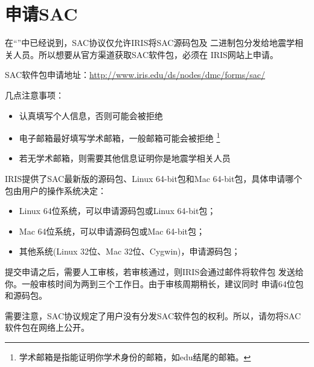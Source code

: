 \section{申请SAC}
在``''中已经说到，SAC协议仅允许IRIS将SAC源码包及
二进制包分发给地震学相关人员。所以想要从官方渠道获取SAC软件包，必须在
IRIS网站上申请。

SAC软件包申请地址：\url{http://www.iris.edu/ds/nodes/dmc/forms/sac/}

几点注意事项：
\begin{itemize}
\item 认真填写个人信息，否则可能会被拒绝
\item 电子邮箱最好填写学术邮箱，一般邮箱可能会被拒绝
    \footnote{学术邮箱是指能证明你学术身份的邮箱，如edu结尾的邮箱。}
\item 若无学术邮箱，则需要其他信息证明你是地震学相关人员
\end{itemize}

IRIS提供了SAC最新版的源码包、Linux 64-bit包和Mac 64-bit包，具体申请哪个
包由用户的操作系统决定：
\begin{itemize}
\item Linux 64位系统，可以申请源码包或Linux 64-bit包；
\item Mac 64位系统，可以申请源码包或Mac 64-bit包；
\item 其他系统(Linux 32位、Mac 32位、Cygwin)，申请源码包；
\end{itemize}

提交申请之后，需要人工审核，若审核通过，则IRIS会通过邮件将软件包
发送给你。一般审核时间为两到三个工作日。由于审核周期稍长，建议同时
申请64位包和源码包。

需要注意，SAC协议规定了用户没有分发SAC软件包的权利。所以，请勿将SAC
软件包在网络上公开。
